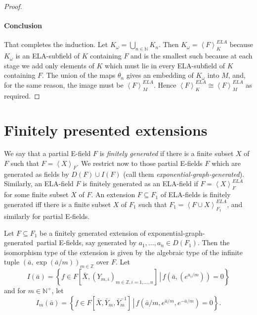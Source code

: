 \documentclass[12pt]{amsart}
\theoremstyle{definition}
\begin{document}
\begin{proof}
\paragraph{Conclusion}
That completes the induction. Let $K_\omega = \bigcup_{n \in {\ensuremath{\mathbb{N}}}} K_n$. Then $K_\omega = {\ensuremath{\left\langle {F} \right\rangle}}_K^{ELA}$ because $K_\omega$ is an ELA-subfield of $K$ containing $F$ and is the smallest such because at each stage we add only elements of $K$ which must lie in every ELA-subfield of $K$ containing $F$. The union of the maps $\theta_n$ gives an embedding of $K_\omega$ into $M$, and, for the same reason, the image must be ${\ensuremath{\left\langle {F} \right\rangle}}_M^{ELA}$. Hence ${\ensuremath{\left\langle {F} \right\rangle}}_K^{ELA} {\cong} {\ensuremath{\left\langle {F} \right\rangle}}_M^{ELA}$ as required.
\end{proof}

\section{Finitely presented extensions}

 We say that a partial E-field $F$ is \emph{finitely generated} if there is a finite subset $X$ of $F$ such that $F = {\ensuremath{\left\langle {X} \right\rangle}}_F$. We restrict now to those partial E-fields $F$ which are generated as fields by $D(F) \cup I(F)$ (call them \emph{exponential-graph-generated}). Similarly, an ELA-field $F$ is finitely generated as an ELA-field if $F = {\ensuremath{\left\langle {X} \right\rangle}}_F^{ELA}$ for some finite subset $X$ of $F$. An extension $F {\subseteq} F_1$ of ELA-fields is finitely generated iff there is a finite subset $X$ of $F_1$ such that $F_1 = {\ensuremath{\left\langle {F \cup X} \right\rangle}}_{F_1}^{ELA}$, and similarly for partial E-fields.

Let $F {\subseteq} F_1$ be a finitely generated extension of {exponential-graph-generated}\ partial E-fields, say generated by $a_1,\ldots,a_n \in D(F_1)$. Then the isomorphism type of the extension is given by the algebraic type of the infinite tuple $(\bar{a},\exp(\bar{a}/m))_{m \in {\ensuremath{\mathbb{Z}}}}$ over $F$. Let
 \[I(\bar{a}) = {\ensuremath{\left\{ {f \in F[\bar{X},(Y_{m,i})_{m \in {\ensuremath{\mathbb{Z}}}, i=1,\ldots,n}]} \,\left|\, {f(\bar{a},(e^{a_i/m}))
  = 0} \right.\right\}}}\]
 and for $m \in {\ensuremath{\mathbb{N}}}^+$, let 
\[I_m(\bar{a}) = {\ensuremath{\left\{ {f \in F[\bar{X},\bar{Y}_m, {{\ensuremath{\bar{Y}}}}_m^{-1}]} \,\left|\, {f(\bar{a}/m,e^{\bar{a}/m}, e^{-\bar{a}/m}) = 0} \right.\right\}}}.\]
\end{document}
